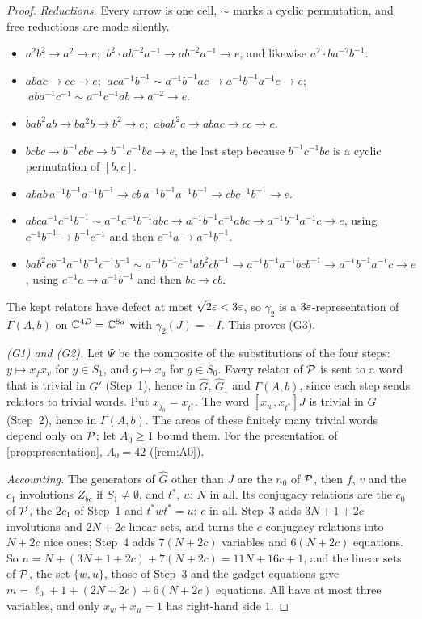 \begin{proof}
\emph{Reductions.} Every arrow is one cell, $\sim$ marks a cyclic permutation, and free reductions are made silently.
\begin{itemize}[itemsep=1pt]
\item $a^2b^2\to a^2\to e$; $\ b^2\cdot ab^{-2}a^{-1}\to ab^{-2}a^{-1}\to e$, and likewise $a^2\cdot ba^{-2}b^{-1}$.
\item $abac\to cc\to e$; $\ aca^{-1}b^{-1}\sim a^{-1}b^{-1}ac\to a^{-1}b^{-1}a^{-1}c\to e$; $\ aba^{-1}c^{-1}\sim a^{-1}c^{-1}ab\to a^{-2}\to e$.
\item $bab^2ab\to ba^2b\to b^2\to e$; $\ abab^2c\to abac\to cc\to e$.
\item $bcbc\to b^{-1}cbc\to b^{-1}c^{-1}bc\to e$, the last step because $b^{-1}c^{-1}bc$ is a cyclic permutation of $[b,c]$.
\item $abab\,a^{-1}b^{-1}a^{-1}b^{-1}\to cb\,a^{-1}b^{-1}a^{-1}b^{-1}\to cbc^{-1}b^{-1}\to e$.
\item $abca^{-1}c^{-1}b^{-1}\sim a^{-1}c^{-1}b^{-1}abc\to a^{-1}b^{-1}c^{-1}abc\to a^{-1}b^{-1}a^{-1}c\to e$, using $c^{-1}b^{-1}\to
b^{-1}c^{-1}$ and then $c^{-1}a\to a^{-1}b^{-1}$.
\item $bab^2cb^{-1}a^{-1}b^{-1}c^{-1}b^{-1}\sim a^{-1}b^{-1}c^{-1}ab^2cb^{-1}\to a^{-1}b^{-1}a^{-1}bcb^{-1}\to a^{-1}b^{-1}a^{-1}c\to e$, using
$c^{-1}a\to a^{-1}b^{-1}$ and then $bc\to cb$.
\end{itemize}

The kept relators have defect at most $\sqrt2\varepsilon<3\varepsilon$, so $\gamma_2$ is a $3\varepsilon$-representation of $\Gamma(A,b)$ on
$\mathbb C^{4D}=\mathbb C^{8d}$ with $\gamma_2(J)=-I$. This proves (G3).

\emph{(G1) and (G2).} Let $\Psi$ be the composite of the substitutions of the four steps: $y\mapsto x_fx_v$ for $y\in S_1$, and $g\mapsto x_g$
for $g\in S_0$. Every relator of $\mathcal P$ is sent to a word that is trivial in $G'$ (Step~1), hence in $\widehat G$, $\widehat G_1$ and
$\Gamma(A,b)$, since each step sends relators to trivial words. Put $x_{j_0}=x_{t^*}$. The word $[x_w,x_{t^*}]J$ is trivial in $\widehat G$
(Step~2), hence in $\Gamma(A,b)$. The areas of these finitely many trivial words depend only on $\mathcal P$; let $A_0\ge1$ bound them. For
the presentation of \cref{prop:presentation}, $A_0=42$ (\cref{rem:A0}).

\emph{Accounting.} The generators of $\widehat G$ other than $J$ are the $n_0$ of $\mathcal P$, then $f$, $v$ and the $c_1$ involutions $Z_{bc}$ if
$S_1\ne\emptyset$, and $t^*$, $u$: $N$ in all. Its conjugacy relations are the $c_0$ of $\mathcal P$, the $2c_1$ of Step~1 and $t^*wt^*=u$: $c$ in all.
Step~3 adds $3N+1+2c$ involutions and $2N+2c$ linear sets, and turns the $c$ conjugacy relations into $N+2c$ nice ones; Step~4 adds
$7(N+2c)$ variables and $6(N+2c)$ equations. So $n=N+(3N+1+2c)+7(N+2c)=11N+16c+1$, and the linear sets of $\mathcal P$, the set $\{w,u\}$, those
of Step~3 and the gadget equations give $m=\ell_0+1+(2N+2c)+6(N+2c)$ equations. All have at most three variables, and only $x_w+x_u=1$ has
right-hand side $1$.
\end{proof}

